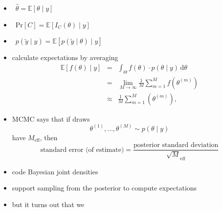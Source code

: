 \documentclass[10pt]{report}
\newcommand{\draw}[2]{#1^{(#2)}}
\newcommand{\displayfrac}[2]{{\displaystyle \frac{\displaystyle #1}{\displaystyle #2}}}
\begin{document}
\begin{itemize}
\item {} \ $\hat{\theta} = \mathbb{E}[\theta \mid y]$
\item {} \ $\textrm{Pr}[C] = \mathbb{E}[I_C(\theta) \mid
  y]$
\item {} \ $p(\tilde{y} \mid y) =
  \mathbb{E}[p(\tilde{y} \mid \theta) \mid y]$
\end{itemize}

\begin{itemize}
  \item calculate  expectations by averaging
\begin{eqnarray*}
  \mathbb{E}[f(\theta) \mid y]
  & = & \textstyle \int_{\Theta} f(\theta) \cdot p(\theta \mid y) \,
        \textrm{d}\theta
        \\[4pt]
  & = & \textstyle \lim_{M \rightarrow \infty} \frac{1}{M} \sum_{m = 1}^M
        f(\draw{\theta}{m})
        \\[4pt]
  & \approx & \textstyle \frac{1}{M} \sum_{m = 1}^M (\draw{\theta}{m}),
\end{eqnarray*}
\item MCMC  says that if draws
\[
  \draw{\theta}{1}, \ldots, \draw{\theta}{M} \sim p(\theta \mid y)
\]
have  $M_{\textrm{eff}}$, then
\[
\textrm{standard error (of estimate)}
  = \displayfrac{\textrm{posterior standard deviation}}
                {\sqrt{M}_{\textrm{eff}}} 
\]
\end{itemize}

\begin{itemize}
\item code Bayesian joint densities
\item support sampling from the posterior to compute expectations
\vfill
\item but it turns out that we
  \\
\end{itemize}
\end{document}
